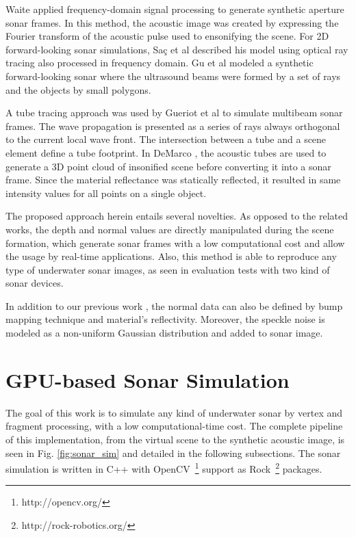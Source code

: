 \documentclass[final,5p,times]{elsarticle}
\begin{document}
Waite \cite{waite2002} applied frequency-domain signal processing to generate synthetic aperture sonar frames. In this method, the acoustic image was created by expressing the Fourier transform of the acoustic pulse used to ensonifying the scene. For 2D forward-looking sonar simulations, Saç et al \cite{sac2015} described his model using optical ray tracing also processed in frequency domain. Gu et al \cite{gu2013} modeled a synthetic forward-looking sonar where the ultrasound beams were formed by a set of rays and the objects by small polygons.

A tube tracing approach was used by Gueriot et al \cite{gueriot2010} to simulate multibeam sonar frames. The wave propagation is presented as a series of rays always orthogonal to the current local wave front. The intersection between a tube and a scene element define a tube footprint. In DeMarco \cite{demarco2015}, the acoustic tubes are used to generate a 3D point cloud of insonified scene before converting it into a sonar frame. Since the material reflectance was statically reflected, it resulted in same intensity values for all points on a single object.

The proposed approach herein entails several novelties. As opposed to the related works, the depth and normal values are directly manipulated during the scene formation, which generate sonar frames with a low computational cost and allow the usage by real-time applications. Also, this method is able to reproduce any type of underwater sonar images, as seen in evaluation tests with two kind of sonar devices.

In addition to our previous work \cite{cerqueira2016}, the normal data can also be defined by bump mapping technique and material's reflectivity. Moreover, the speckle noise is modeled as a non-uniform Gaussian distribution and added to sonar image.


\section{GPU-based Sonar Simulation}
\label{dev}

The goal of this work is to simulate any kind of underwater sonar by vertex and fragment processing, with a low computational-time cost. The complete pipeline of this implementation, from the virtual scene to the synthetic acoustic image, is seen in Fig. \ref{fig:sonar_sim} and detailed in the following subsections. The sonar simulation is written in C++ with OpenCV~\footnote{http://opencv.org/} support as Rock~\footnote{http://rock-robotics.org/} packages.
\end{document}
